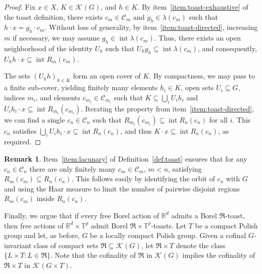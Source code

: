 \documentclass[12pt]{paper}
\numberwithin{equation}{section}
\theoremstyle{plain}
\theoremstyle{definition}
\newtheorem{remark}[theorem]{Remark}
\newcommand{\Rd}{\mathbb{R}^{d}}
\newcommand{\T}{\mathbb{T}}
\newcommand{\mfR}{\mathfrak{R}}
\newcommand{\vietoris}[2][]{\mathcal{K}_{#1}(#2)}
\DeclareMathOperator{\inter}{\mathrm{int}}
\begin{document}
\begin{proof}
  Fix \(x\in X\), \(K\in \vietoris{G}\), and \(h \in K\). By item~\eqref{item:toast-exhaustive} of
  the toast definition, there exists \(c_{m} \in \mathcal{C}_{m}\) and \(g_{h} \in \lambda(c_{m})\)
  such that \(h\cdot x = g_{h}\cdot c_{m}\).  Without loss of generality, by
  item~\eqref{item:toast-directed}, increasing \(m\) if necessary, we may assume
  \(g_{h} \in \inter \lambda(c_{m})\).  Thus, there exists an open neighborhood of the identity
  \(U_{h}\) such that \(U_{h}g_{h} \subseteq \inter \lambda(c_{m})\), and consequently,
  \(U_{h}h \cdot x \subseteq \inter R_{m}(c_{m})\).

  The sets \((U_{h}h)_{h \in K}\) form an open cover of \(K\).  By compactness, we may pass to a
  finite sub-cover, yielding finitely many elements \(h_{i} \in K\), open sets
  \(U_{i} \subseteq G\), indices \(m_{i}\), and elements \(c_{m_{i}} \in \mathcal{C}_{m_{i}}\) such
  that \(K \subseteq \bigcup_{i}U_{i}h_{i}\) and
  \(U_{i}h_{i} \cdot x \subseteq \inter R_{m_{i}}(c_{m_{i}})\).  Iterating the property from
  item~\eqref{item:toast-directed}, we can find a single \(c_{n} \in \mathcal{C}_{n}\) such that
  \(R_{m_{i}}(c_{m_{i}}) \subseteq \inter R_{n}(c_{n})\) for all \(i\).  This \(c_{n}\) satisfies
  \(\bigcup_{i}U_{i}h_{i} \cdot x \subseteq \inter R_{n}(c_{n})\), and thus
  \(K \cdot x \subseteq \inter R_{n}(c_{n})\), as required.
\end{proof}

\begin{remark}
  \label{rem:lacunary-finitely-many-predecessors}
  Item~\eqref{item:lacunary} of Definition~\ref{def:toast} ensures that for any
  \(c_{n} \in \mathcal{C}_{n}\) there are only finitely many \(c_{m} \in \mathcal{C}_{m}\),
  \(m < n\), satisfying \(R_{m}(c_{m}) \subseteq R_{n}(c_{n})\).  This follows easily by identifying
  the orbit of \(c_{n}\) with \(G\) and using the Haar measure to limit the number of pairwise
  disjoint regions \(R_{m}(c_{m})\) inside \(R_{n}(c_{n})\).
\end{remark}


Finally, we argue that if every free Borel action of \(\Rd\) admits a Borel \(\mfR\)-toast, then
free actions of \(\Rd \times \T^p\) admit Borel \(\mfR \times \T^p\)-toasts.  Let \(T\) be a compact
Polish group and let, as before, \(G\) be a locally compact Polish group.  Given a cofinal
\(G\)-invariant class of compact sets \(\mfR \subseteq \vietoris{G}\), let \(\mfR \times T\) denote
the class \(\{L \times T : L \in \mfR\}\).  Note that the cofinality of \(\mfR\) in \(\vietoris{G}\)
implies the cofinality of \(\mfR \times T\) in \(\vietoris{G \times T}\).
\end{document}
